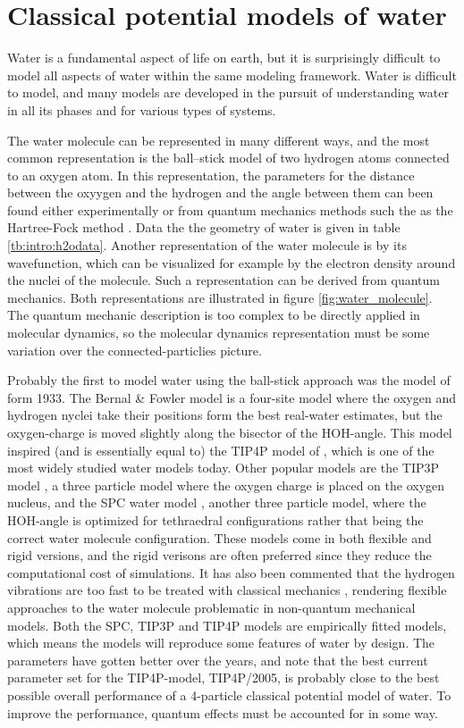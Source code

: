 \section{Classical potential models of water}
Water is a fundamental aspect of life on earth, but it is surprisingly difficult to model all aspects of water within the same modeling framework. Water is difficult to model, and many models are developed in the pursuit of understanding water in all its phases and for various types of systems.

The water molecule can be represented in many different ways, and the most common representation is the ball–stick model of two hydrogen atoms connected to an oxygen atom. In this representation, the parameters for the distance between the oxyygen and the hydrogen and the angle between them can been found either experimentally or from quantum mechanics methods such the as the Hartree-Fock method \cite{fock1930naherungsmethode,slater1930note}. Data the the geometry of water is given in table \ref{tb:intro:h2odata}. Another representation of the water molecule is by its wavefunction, which can be visualized for example by the electron density around the nuclei of the molecule. Such a representation can be derived from quantum mechanics. Both representations are illustrated in figure \ref{fig:water_molecule}. The quantum mechanic description is too complex to be directly applied in molecular dynamics, so the molecular dynamics representation must be some variation over the connected-particlies picture. 

Probably the first to model water using the ball-stick approach was the model of \citet{bernal1933theory} form 1933. The Bernal \& Fowler model is a four-site model where the oxygen and hydrogen nyclei take their positions form the best real-water estimates, but the oxygen-charge is moved slightly along the bisector of the HOH-angle.  This model inspired (and is essentially equal to) the TIP4P model of \citet{Jorgensen1983}, which is one of the most widely studied water models today. Other popular models are the TIP3P model \cite{Jorgensen1983}, a three particle model where the oxygen charge is placed on the oxygen nucleus, and the SPC water model \cite{berendsen1981interaction}, another three particle model, where the HOH-angle is optimized for tethraedral configurations rather that being the correct water molecule configuration. These models come in both flexible and rigid versions, and the rigid verisons are often preferred since they reduce the computational cost of simulations. It has also been commented that the hydrogen vibrations are too fast to be treated with classical mechanics \cite{Vega2011}, rendering flexible approaches to the water molecule problematic in non-quantum mechanical models. Both the SPC, TIP3P and TIP4P models are empirically fitted models, which means the models will reproduce some features of water by design. The parameters have gotten better over the years, and \citet{Vega2011} note that the best current parameter set for the TIP4P-model, TIP4P/2005, is probably close to the best possible overall performance of a 4-particle classical potential model of water. To improve the performance, quantum effects must be accounted for in some way. 


